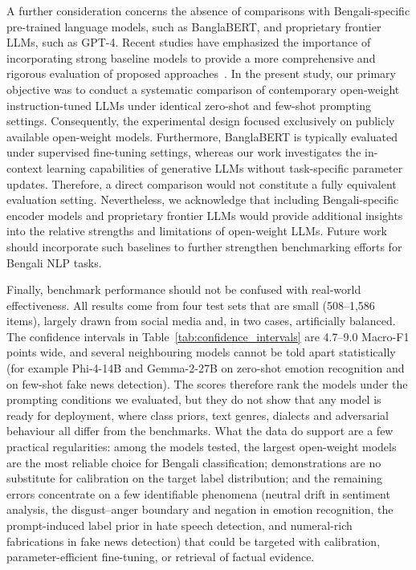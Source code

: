 \documentclass[10pt,letterpaper]{article}
\begin{document}
A further consideration concerns the absence of comparisons with Bengali-specific pre-trained language models, such as BanglaBERT, and proprietary frontier LLMs, such as GPT-4. Recent studies have emphasized the importance of incorporating strong baseline models to provide a more comprehensive and rigorous evaluation of proposed approaches~\cite{b49,b50,b51,b52,b53}. In the present study, our primary objective was to conduct a systematic comparison of contemporary open-weight instruction-tuned LLMs under identical zero-shot and few-shot prompting settings. Consequently, the experimental design focused exclusively on publicly available open-weight models. Furthermore, BanglaBERT is typically evaluated under supervised fine-tuning settings, whereas our work investigates the in-context learning capabilities of generative LLMs without task-specific parameter updates. Therefore, a direct comparison would not constitute a fully equivalent evaluation setting. Nevertheless, we acknowledge that including Bengali-specific encoder models and proprietary frontier LLMs would provide additional insights into the relative strengths and limitations of open-weight LLMs. Future work should incorporate such baselines to further strengthen benchmarking efforts for Bengali NLP tasks.


Finally, benchmark performance should not be confused with real-world effectiveness. All results come from four test sets that are small (508--1,586 items), largely drawn from social media and, in two cases, artificially balanced. The confidence intervals in Table~\ref{tab:confidence_intervals} are 4.7--9.0 Macro-F1 points wide, and several neighbouring models cannot be told apart statistically (for example Phi-4-14B and Gemma-2-27B on zero-shot emotion recognition and on few-shot fake news detection). The scores therefore rank the models under the prompting conditions we evaluated, but they do not show that any model is ready for deployment, where class priors, text genres, dialects and adversarial behaviour all differ from the benchmarks. What the data do support are a few practical regularities: among the models tested, the largest open-weight models are the most reliable choice for Bengali classification; demonstrations are no substitute for calibration on the target label distribution; and the remaining errors concentrate on a few identifiable phenomena (neutral drift in sentiment analysis, the disgust--anger boundary and negation in emotion recognition, the prompt-induced label prior in hate speech detection, and numeral-rich fabrications in fake news detection) that could be targeted with calibration, parameter-efficient fine-tuning, or retrieval of factual evidence.
\end{document}
